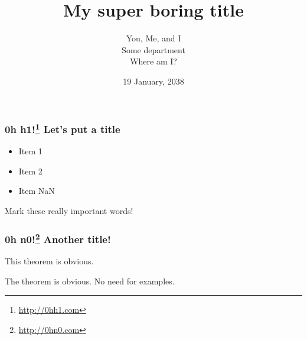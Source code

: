 \documentclass{beamer}
\title{My super boring title}
\author{You, Me, and I\\[2mm]
\footnotesize{Some department\\
Where am I?}}
\date{19 January, 2038}
\begin{document}
\maketitle

    \begin{frame}
        \frametitle{0h h1!\footnote{\url{http://0hh1.com}} Let's put a title}
        \begin{itemize}
            \item Item 1
            \item Item 2
            \item Item NaN
        \end{itemize}
        \begin{block}{}
            \begin{center}
                Mark these really important words!
            \end{center}
        \end{block}
    \end{frame}


    \begin{frame}
    \frametitle{0h n0!\footnote{\url{http://0hn0.com}} Another title!}
        
        \begin{theorem}
            This theorem is obvious.
        \end{theorem}
        \begin{example}
            The theorem is obvious. No need for examples.
        \end{example}
    \end{frame}
\end{document}
